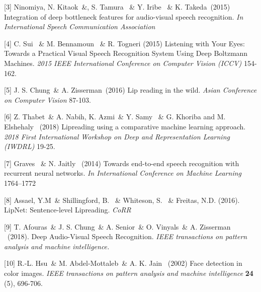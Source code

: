 \documentclass{article}
\begin{document}
[3]  Ninomiya, N. Kitaok\ \&, S. Tamura \ \& Y. Iribe \ \&  K. Takeda\ (2015) Integration of deep bottleneck features for audio-visual speech recognition. {\it In International Speech Communication Association}

[4] C. Sui \ \& M. Bennamoun \ \& R. Togneri (2015) Listening with Your Eyes: Towards a Practical Visual Speech Recognition System Using Deep Boltzmann Machines. {\it 2015 IEEE International Conference on Computer Vision (ICCV)} 154-162.

[5] J. S. Chung\ \& A. Zisserman\ (2016) Lip reading in the wild. {\it Asian Conference on Computer Vision} 87-103.

[6] Z. Thabet\ \& A. Nabih, K. Azmi\ \& Y. Samy \ \& G. Khoriba and M. Elshehaly \ (2018) Lipreading using a comparative machine learning approach. {\it 2018 First International Workshop on Deep and Representation Learning (IWDRL)} 19-25.

[7]  Graves \ \& N. Jaitly \ (2014) Towards end-to-end speech recognition with recurrent neural networks. {\it In International Conference on Machine Learning} 1764–1772

[8] Assael, Y.M\ \& Shillingford, B. \ \& Whiteson, S. \ \& Freitas, N.D. (2016). LipNet: Sentence-level Lipreading. {\it CoRR}

[9] T. Afouras\ \& J. S. Chung\ \& A. Senior\ \& O. Vinyals\ \& A. Zisserman \ (2018). Deep Audio-Visual Speech Recognition. {\it IEEE transactions on pattern analysis and machine intelligence.}

[10] R.-L. Hsu\ \& M. Abdel-Mottaleb\ \& A. K. Jain \ (2002) Face detection in color images. {\it IEEE transactions on pattern analysis and machine intelligence} {\bf 24} (5), 696-706.
\end{document}
